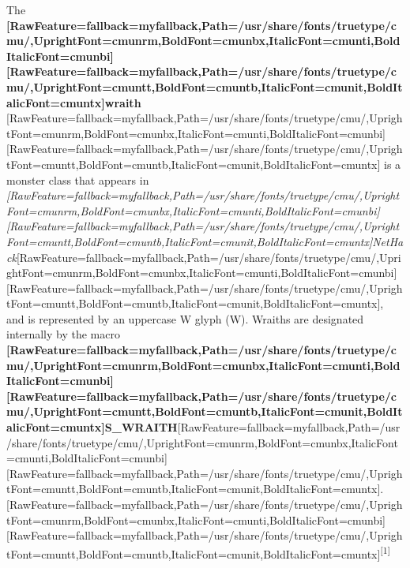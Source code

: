 \documentclass[fontsize=11pt,paper=A4,BCOR=12mm,DIV=13,open=any,listof=totoc,toc=flat]{scrbook}
\begin{document}
The {\bfseries \allowbreak{}\setmainfont{cmunbx.ttf}[RawFeature={fallback=myfallback},Path=/usr/share/fonts/truetype/cmu/,UprightFont=cmunrm,BoldFont=cmunbx,ItalicFont=cmunti,BoldItalicFont=cmunbi]\setmonofont{cmunbx.ttf}[RawFeature={fallback=myfallback},Path=/usr/share/fonts/truetype/cmu/,UprightFont=cmuntt,BoldFont=cmuntb,ItalicFont=cmunit,BoldItalicFont=cmuntx]\bfseries wraith}{$\text{ }$}\allowbreak{}\setmainfont{cmunrm.ttf}[RawFeature={fallback=myfallback},Path=/usr/share/fonts/truetype/cmu/,UprightFont=cmunrm,BoldFont=cmunbx,ItalicFont=cmunti,BoldItalicFont=cmunbi]\setmonofont{cmunrm.ttf}[RawFeature={fallback=myfallback},Path=/usr/share/fonts/truetype/cmu/,UprightFont=cmuntt,BoldFont=cmuntb,ItalicFont=cmunit,BoldItalicFont=cmuntx] is a monster class\footnotemark[2] that appears in {\itshape \allowbreak{}\setmainfont{cmunti.ttf}[RawFeature={fallback=myfallback},Path=/usr/share/fonts/truetype/cmu/,UprightFont=cmunrm,BoldFont=cmunbx,ItalicFont=cmunti,BoldItalicFont=cmunbi]\setmonofont{cmunti.ttf}[RawFeature={fallback=myfallback},Path=/usr/share/fonts/truetype/cmu/,UprightFont=cmuntt,BoldFont=cmuntb,ItalicFont=cmunit,BoldItalicFont=cmuntx]\itshape NetHack\footnotemark[3]}\allowbreak{}\setmainfont{cmunrm.ttf}[RawFeature={fallback=myfallback},Path=/usr/share/fonts/truetype/cmu/,UprightFont=cmunrm,BoldFont=cmunbx,ItalicFont=cmunti,BoldItalicFont=cmunbi]\setmonofont{cmunrm.ttf}[RawFeature={fallback=myfallback},Path=/usr/share/fonts/truetype/cmu/,UprightFont=cmuntt,BoldFont=cmuntb,ItalicFont=cmunit,BoldItalicFont=cmuntx], and is represented by an uppercase W\footnotemark[4] glyph (W). Wraiths are designated internally by the macro {\bfseries \allowbreak{}\setmainfont{cmunbx.ttf}[RawFeature={fallback=myfallback},Path=/usr/share/fonts/truetype/cmu/,UprightFont=cmunrm,BoldFont=cmunbx,ItalicFont=cmunti,BoldItalicFont=cmunbi]\setmonofont{cmunbx.ttf}[RawFeature={fallback=myfallback},Path=/usr/share/fonts/truetype/cmu/,UprightFont=cmuntt,BoldFont=cmuntb,ItalicFont=cmunit,BoldItalicFont=cmuntx]\bfseries S\_WRAITH}\allowbreak{}\setmainfont{cmunrm.ttf}[RawFeature={fallback=myfallback},Path=/usr/share/fonts/truetype/cmu/,UprightFont=cmunrm,BoldFont=cmunbx,ItalicFont=cmunti,BoldItalicFont=cmunbi]\setmonofont{cmunrm.ttf}[RawFeature={fallback=myfallback},Path=/usr/share/fonts/truetype/cmu/,UprightFont=cmuntt,BoldFont=cmuntb,ItalicFont=cmunit,BoldItalicFont=cmuntx].\allowbreak{}\setmainfont{cmunrm.ttf}[RawFeature={fallback=myfallback},Path=/usr/share/fonts/truetype/cmu/,UprightFont=cmunrm,BoldFont=cmunbx,ItalicFont=cmunti,BoldItalicFont=cmunbi]\setmonofont{cmunrm.ttf}[RawFeature={fallback=myfallback},Path=/usr/share/fonts/truetype/cmu/,UprightFont=cmuntt,BoldFont=cmuntb,ItalicFont=cmunit,BoldItalicFont=cmuntx]\textsuperscript{{$\text{[}$}1{$\text{]}$}}
\end{document}
